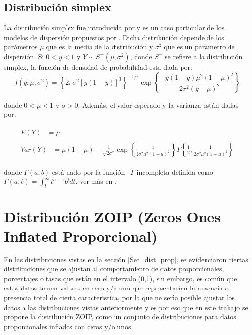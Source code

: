\subsection{Distribuci\'{o}n simplex}

La distribuci\'{o}n simplex fue introducida por \cite{Barndorff1} y es un caso particular de los modelos de dispersi\'{o}n propuestos por \cite{Jorgensen1}. Dicha distribuci\'{o}n depende de los par\'{a}metros $\mu$ que es la media de la distribuci\'{o}n y $\sigma^2$ que es un par\'{a}metro de dispersi\'{o}n. Si $0<y<1$ y $Y \sim S^{-}(\mu, \sigma^2)$, donde $S^{-}$ se refiere a la distribuci\'{o}n simplex, la funci\'{o}n de densidad de probabilidad esta dada por:
\begin{equation}
f(y;\mu,\sigma^2)=\left\{2\pi\sigma^2[y(1-y)]^3\right\}^{-1/2}\exp\left\{-\frac{y(1-y)\mu^2(1-\mu)^2}{2\sigma^2(y-\mu)^2}\right\}
\end{equation}

donde $0<\mu<1$ y $\sigma>0$. Adem\'{a}s, el valor esperado y la varianza est\'{a}n dadas por:

\begin{align}
\begin{split}
	E(Y) &= \mu 
\end{split} \label{E_Simplex} \\
\begin{split}
	Var(Y) &= \mu(1-\mu)-\frac{1}{\sqrt{2\sigma^2}}\exp\left\{\frac{1}{2\sigma^2\mu^2(1-\mu)^2}\right\}\Gamma\left\{\frac{1}{2},\frac{1}{2\sigma^2\mu^2(1-\mu)^2}\right\}
\end{split} \label{V_Simplex}
\end{align}

donde $\Gamma(a,b)$ est\'{a} dado por la funci\'{o}n$-\Gamma$ incompleta definida como $\Gamma(a,b)=\int_{b}^{\infty}{t^{a-1}b^tdt}$. ver m\'{a}s en \cite{Zhang1}.

\section{Distribuci\'{o}n ZOIP (Zeros Ones Inflated Proporcional)}\label{Sec_dist_zoip}

En las distribuciones vistas en la secci\'{o}n \ref{Sec_dist_prop}, se evidenciaron ciertas distribuciones que se ajustan al comportamiento de datos proporcionales, porcentajes o tasas que est\'{a}n en el intervalo (0,1), sin embargo, es com\'{u}n que estos datos tomen valores en cero y/o uno que representar\'{\i}an la ausencia o presencia total de cierta caracter\'{\i}stica, por lo que no ser\'{\i}a posible ajustar los datos a las distribuciones vistas anteriormente y es por eso que en este trabajo se propone la distribuci\'{o}n ZOIP, como un conjunto de distribuciones para datos proporcionales inflados con ceros y/o unos.

